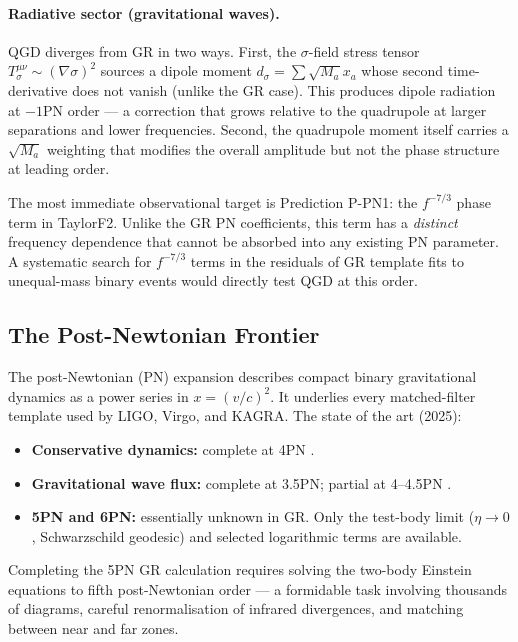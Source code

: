 \documentclass[11pt,a4paper]{article}
\theoremstyle{definition}
\theoremstyle{remark}
\begin{document}
	\paragraph{Radiative sector (gravitational waves).}
	QGD diverges from GR in two ways.  First, the $\sigma$-field stress
	tensor $T^{\mu\nu}_\sigma\sim(\nabla\sigma)^2$ sources a dipole
	moment $d_\sigma=\sum\sqrt{M_a}x_a$ whose second time-derivative does
	not vanish (unlike the GR case).  This produces dipole radiation at
	$-1$PN order — a correction that grows relative to the quadrupole
	at larger separations and lower frequencies.  Second, the quadrupole
	moment itself carries a $\sqrt{M_a}$ weighting that modifies the
	overall amplitude but not the phase structure at leading order.
	
	The most immediate observational target is Prediction P-PN1: the
	$f^{-7/3}$ phase term in TaylorF2.  Unlike the GR PN coefficients,
	this term has a \emph{distinct} frequency dependence that cannot be
	absorbed into any existing PN parameter.  A systematic search for
	$f^{-7/3}$ terms in the residuals of GR template fits to unequal-mass
	binary events would directly test QGD at this order.
	
	\subsection{The Post-Newtonian Frontier}
	
	The post-Newtonian (PN) expansion describes compact binary
	gravitational dynamics as a power series in $x=(v/c)^2$.
	It underlies every matched-filter template used by LIGO, Virgo,
	and KAGRA.  The state of the art (2025):
	\begin{itemize}
		\item \textbf{Conservative dynamics:} complete at 4PN
		\cite{Bern2021,Bernard2018,Damour2014}.
		\item \textbf{Gravitational wave flux:} complete at 3.5PN;
		partial at 4--4.5PN \cite{Blanchet2024}.
		\item \textbf{5PN and 6PN:} essentially unknown in GR.
		Only the test-body limit ($\eta\to0$, Schwarzschild geodesic)
		and selected logarithmic terms are available.
	\end{itemize}
	
	Completing the 5PN GR calculation requires solving the two-body
	Einstein equations to fifth post-Newtonian order — a formidable
	task involving thousands of diagrams, careful renormalisation of
	infrared divergences, and matching between near and far zones.
	
\end{document}
